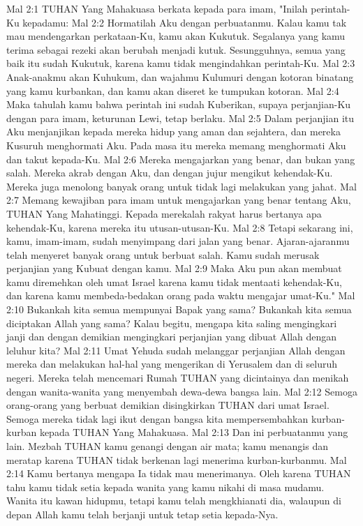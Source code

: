 Mal 2:1  TUHAN Yang Mahakuasa berkata kepada para imam, "Inilah perintah-Ku kepadamu:
Mal 2:2  Hormatilah Aku dengan perbuatanmu. Kalau kamu tak mau mendengarkan perkataan-Ku, kamu akan Kukutuk. Segalanya yang kamu terima sebagai rezeki akan berubah menjadi kutuk. Sesungguhnya, semua yang baik itu sudah Kukutuk, karena kamu tidak mengindahkan perintah-Ku.
Mal 2:3  Anak-anakmu akan Kuhukum, dan wajahmu Kulumuri dengan kotoran binatang yang kamu kurbankan, dan kamu akan diseret ke tumpukan kotoran.
Mal 2:4  Maka tahulah kamu bahwa perintah ini sudah Kuberikan, supaya perjanjian-Ku dengan para imam, keturunan Lewi, tetap berlaku.
Mal 2:5  Dalam perjanjian itu Aku menjanjikan kepada mereka hidup yang aman dan sejahtera, dan mereka Kusuruh menghormati Aku. Pada masa itu mereka memang menghormati Aku dan takut kepada-Ku.
Mal 2:6  Mereka mengajarkan yang benar, dan bukan yang salah. Mereka akrab dengan Aku, dan dengan jujur mengikut kehendak-Ku. Mereka juga menolong banyak orang untuk tidak lagi melakukan yang jahat.
Mal 2:7  Memang kewajiban para imam untuk mengajarkan yang benar tentang Aku, TUHAN Yang Mahatinggi. Kepada merekalah rakyat harus bertanya apa kehendak-Ku, karena mereka itu utusan-utusan-Ku.
Mal 2:8  Tetapi sekarang ini, kamu, imam-imam, sudah menyimpang dari jalan yang benar. Ajaran-ajaranmu telah menyeret banyak orang untuk berbuat salah. Kamu sudah merusak perjanjian yang Kubuat dengan kamu.
Mal 2:9  Maka Aku pun akan membuat kamu diremehkan oleh umat Israel karena kamu tidak mentaati kehendak-Ku, dan karena kamu membeda-bedakan orang pada waktu mengajar umat-Ku."
Mal 2:10  Bukankah kita semua mempunyai Bapak yang sama? Bukankah kita semua diciptakan Allah yang sama? Kalau begitu, mengapa kita saling mengingkari janji dan dengan demikian mengingkari perjanjian yang dibuat Allah dengan leluhur kita?
Mal 2:11  Umat Yehuda sudah melanggar perjanjian Allah dengan mereka dan melakukan hal-hal yang mengerikan di Yerusalem dan di seluruh negeri. Mereka telah mencemari Rumah TUHAN yang dicintainya dan menikah dengan wanita-wanita yang menyembah dewa-dewa bangsa lain.
Mal 2:12  Semoga orang-orang yang berbuat demikian disingkirkan TUHAN dari umat Israel. Semoga mereka tidak lagi ikut dengan bangsa kita mempersembahkan kurban-kurban kepada TUHAN Yang Mahakuasa.
Mal 2:13  Dan ini perbuatanmu yang lain. Mezbah TUHAN kamu genangi dengan air mata; kamu menangis dan meratap karena TUHAN tidak berkenan lagi menerima kurban-kurbanmu.
Mal 2:14  Kamu bertanya mengapa Ia tidak mau menerimanya. Oleh karena TUHAN tahu kamu tidak setia kepada wanita yang kamu nikahi di masa mudamu. Wanita itu kawan hidupmu, tetapi kamu telah mengkhianati dia, walaupun di depan Allah kamu telah berjanji untuk tetap setia kepada-Nya.
